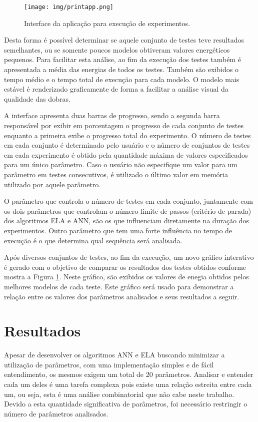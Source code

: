 \documentclass[dm,ppgcomp]{texfurg}
\begin{document}
\begin{figure}[htbp]
  \centering \texttt{[image: img/printapp.png]}
\caption{Interface da aplicação para execução de experimentos.} 
\label{printapp}
\end{figure}

Desta forma é possível determinar se aquele conjunto de testes teve resultados semelhantes, ou se somente poucos modelos obtiveram valores energéticos pequenos. Para facilitar esta análise, ao fim da execução dos testes também é apresentada a média das energias de todos os testes. Também são exibidos o tempo médio e o tempo total de execução para cada modelo. O modelo mais estável é renderizado graficamente de forma a facilitar a análise visual da qualidade das dobras. 

A interface apresenta duas barras de progresso, sendo a segunda barra responsável por exibir em porcentagem o progresso de cada conjunto de testes enquanto a primeira exibe o progresso total do experimento. O número de testes em cada conjunto é determinado pelo usuário e o número de conjuntos de testes em cada experimento é obtido pela quantidade máxima de valores especificados para um único parâmetro. Caso o usuário não especifique um valor para um parâmetro em testes consecutivos, é utilizado o último valor em memória utilizado por aquele parâmetro.

O parâmetro que controla o número de testes em cada conjunto, juntamente com os dois parâmetros que controlam o número limite de passos (critério de parada) dos algoritmos ELA e ANN, são os que influenciam diretamente na duração dos experimentos. Outro parâmetro que tem uma forte influência no tempo de execução é o que determina qual sequência será analisada. 

Após diversos conjuntos de testes, ao fim da execução, um novo gráfico interativo é gerado com o objetivo de comparar os resultados dos testes obtidos conforme mostra a Figura \ref{printapp}. Neste gráfico, são exibidos os valores de enegia obtidos pelos melhores modelos de cada teste. Este gráfico será usado para demonstrar a relação entre os valores dos parâmetros analisados e seus resultados a seguir.

\chapter{Resultados}

Apesar de desenvolver os algoritmos ANN e ELA buscando minimizar a utilização de parâmetros, com uma implementação simples e de fácil entendimento, os mesmos exigem um total de 20 parâmetros. Analisar e entender cada um deles é uma tarefa complexa pois existe uma relação estreita entre cada um, ou seja, esta é uma análise combinatorial que não cabe neste trabalho. Devido a esta quantidade significativa de parâmetros, foi necessário restringir o número de parâmetros analisados.
\end{document}

